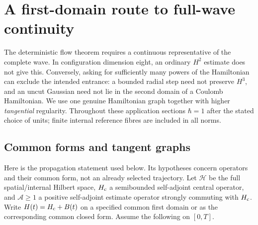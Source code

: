 \documentclass[11pt]{article}
\numberwithin{equation}{section}
\theoremstyle{definition}
\theoremstyle{remark}
\begin{document}
\section{A first-domain route to full-wave continuity}
\label{p3d:sec:graph}

The deterministic flow theorem requires a continuous representative of
the complete wave. In configuration dimension eight, an ordinary
$H^2$ estimate does not give this. Conversely, asking for sufficiently
many powers of the Hamiltonian can exclude the intended entrance:
a bounded radial step need not preserve $H^3$, and an uncut Gaussian
need not lie in the second domain of a Coulomb Hamiltonian. We use one
genuine Hamiltonian graph together with higher \emph{tangential}
regularity. Throughout these application sections $\hbar=1$ after
the stated choice of units; finite internal reference fibres are
included in all norms.

\subsection{Common forms and tangent graphs}

Here is the propagation statement used below. Its hypotheses concern
operators and their common form, not an already selected trajectory.
Let $\mathcal H$ be the full spatial/internal Hilbert space,
$H_{\rm c}$ a semibounded self-adjoint central operator, and
$\mathcal A\geq1$ a positive self-adjoint estimate operator strongly
commuting with $H_{\rm c}$. Write
$H(t)=H_{\rm c}+B(t)$ on a specified common first domain or as the
corresponding common closed form. Assume the following on $[0,T]$.
\end{document}
